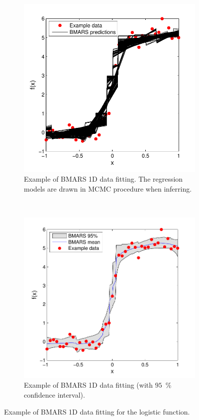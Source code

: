 \documentclass[review]{elsarticle}
\begin{document}
\begin{figure}[ht!]
\begin{subfigure}{0.5\textwidth}
\centering
\hspace*{-2.2cm}\includegraphics[width=1.4\linewidth]{NSE15-48R1_Figure8a.pdf}
\caption{Example of BMARS 1D data fitting. The regression models are drawn in MCMC procedure when inferring.}
\label{fg:bmex1}
\end{subfigure}
~
\begin{subfigure}{0.5\textwidth}
\centering
\vspace*{-0.5cm}\includegraphics[width=1.4\linewidth]{NSE15-48R1_Figure8b.pdf}
\caption{Example of BMARS 1D data fitting (with $95$~\% confidence interval).}
\label{fg:bmex2}
\end{subfigure}
\caption{Example of BMARS 1D data fitting for the logistic function.}
\label{fg:bmexs}
\end{figure}
\end{document}
